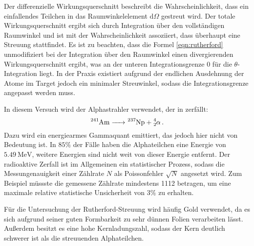 Der differenzielle Wirkungsquerschnitt beschreibt die Wahrscheinlichkeit, dass ein einfallendes Teilchen in das Raumwinkelelement $\mathrm{d} \Omega$ gestreut wird. Der totale Wirkungsquerschnitt ergibt sich durch Integration über den vollständigen Raumwinkel und ist mit der Wahrscheinlichkeit assoziiert, dass überhaupt eine Streuung stattfindet. Es ist zu beachten, dass die Formel \eqref{eqn:rutherford} unmodifiziert bei der Integration über den Raumwinkel einen divergierenden Wirkungsquerschnitt ergibt, was an der unteren Integrationsgrenze $0$ für die $\theta$-Integration liegt. In der Praxis existiert aufgrund der endlichen Ausdehnung der Atome im Target jedoch ein minimaler Streuwinkel, sodass die Integrationsgrenze angepasst werden muss.

In diesem Versuch wird der Alphastrahler  verwendet, der in  zerfällt:
\begin{equation*}
  \ce{^{241}Am -> ^{237}Np + ^4_2} \alpha\,.
\end{equation*}
Dazu wird ein energiearmes Gammaquant emittiert, das jedoch hier nicht von Bedeutung ist. In $85\%$ der Fälle haben die Alphateilchen eine Energie von $\SI{5.49}{\mega\electronvolt}$, weitere Energien sind nicht weit von dieser Energie entfernt. Der radioaktive Zerfall ist im Allgemeinen ein statistischer Prozess, sodass die Messungenauigkeit einer Zählrate $N$ als Poissonfehler $\sqrt{N}$ angesetzt wird. Zum Beispiel müssste die gemessene Zählrate mindestens 1112 betragen, um eine maximale relative statistische Unsicherheit von $3\%$ zu erhalten.

Für die Untersuchung der Rutherford-Streuung wird häufig Gold verwendet, da es sich aufgrund seiner guten Formbarkeit zu sehr dünnen Folien verarbeiten lässt. Außerdem besitzt es eine hohe Kernladungszahl, sodass der Kern deutlich schwerer ist als die streuuenden Alphateilchen.
